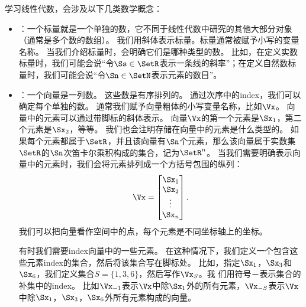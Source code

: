 学习线性代数，会涉及以下几类数学概念：
\begin{itemize}
    \item {}：一个标量就是一个单独的数，它不同于线性代数中研究的其他大部分对象（通常是多个数的数组）。
    我们用斜体表示标量。标量通常被赋予小写的变量名称。
    当我们介绍标量时，会明确它们是哪种类型的数。
    比如，在定义实数标量时，我们可能会说``令$\Ss \in \SetR$表示一条线的斜率''；在定义自然数标量时，我们可能会说``令$\Sn\in\SetN$表示元素的数目''。


    \item {}：一个向量是一列数。
    这些数是有序排列的。
    通过次序中的\gls{index}，我们可以确定每个单独的数。
    通常我们赋予向量粗体的小写变量名称，比如$\Vx$。
    向量中的元素可以通过带脚标的斜体表示。
    向量$\Vx$的第一个元素是$\Sx_1$，第二个元素是$\Sx_2$，等等。
    我们也会注明存储在向量中的元素是什么类型的。
    如果每个元素都属于$\SetR$，并且该向量有$\Sn$个元素，那么该向量属于实数集$\SetR$的$\Sn$次笛卡尔乘积构成的集合，记为$\SetR^n$。
    当我们需要明确表示向量中的元素时，我们会将元素排列成一个方括号包围的纵列：
    \begin{equation}
        \Vx=\begin{bmatrix} \Sx_1   \\  
                            \Sx_2   \\ 
                            \vdots  \\ 
                            \Sx_n 
                \end{bmatrix}.
    \end{equation}
    我们可以把向量看作空间中的点，每个元素是不同坐标轴上的坐标。
    
    有时我们需要\gls{index}向量中的一些元素。
    在这种情况下，我们定义一个包含这些元素\gls{index}的集合，然后将该集合写在脚标处。
    比如，指定$\Sx_1$，$\Sx_3$和$\Sx_6$，我们定义集合$S=\{1,3,6\}$，然后写作$\Vx_S$。我
    们用符号－表示集合的补集中的\gls{index}。
    比如$\Vx_{-1}$表示$\Vx$中除$\Sx_1$外的所有元素，$\Vx_{-S}$表示$\Vx$中除$\Sx_1$，$\Sx_3$，$\Sx_6$外所有元素构成的向量。


\end{itemize}
